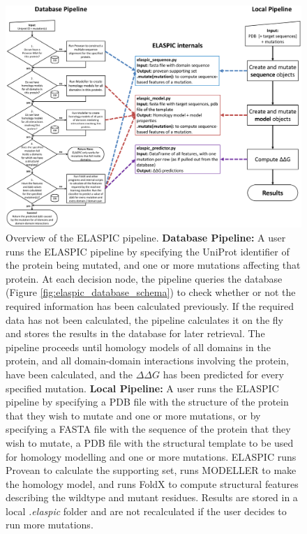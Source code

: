 \begin{figure}[!tb]
	\centering
	\includegraphics[width=1.0\textwidth]{static/elaspic/elaspic_flowchart.pdf}
	\caption[ELASPIC pipeline.]{Overview of the ELASPIC pipeline. \textbf{Database Pipeline:} A user runs the ELASPIC pipeline by specifying the UniProt identifier of the protein being mutated, and one or more mutations affecting that protein. At each decision node, the pipeline queries the database (Figure \ref{fig:elaspic_database_schema}) to check whether or not the required information has been calculated previously. If the required data has not been calculated, the pipeline calculates it on the fly and stores the results in the database for later retrieval. The pipeline proceeds until homology models of all domains in the protein, and all domain-domain interactions involving the protein, have been calculated, and the $\Delta \Delta G$ has been predicted for every specified mutation. \textbf{Local Pipeline:} A user runs the ELASPIC pipeline by specifying a PDB file with the structure of the protein that they wish to mutate and one or more mutations, or by specifying a FASTA file with the sequence of the protein that they wish to mutate, a PDB file with the structural template to be used for homology modelling and one or more mutations. ELASPIC runs Provean to calculate the supporting set, runs MODELLER to make the homology model, and runs FoldX to compute structural features describing the wildtype and mutant residues. Results are stored in a local \textit{.elaspic} folder and are not recalculated if the user decides to run more mutations.}
	\label{fig:elaspic_pipeline}
\end{figure}


